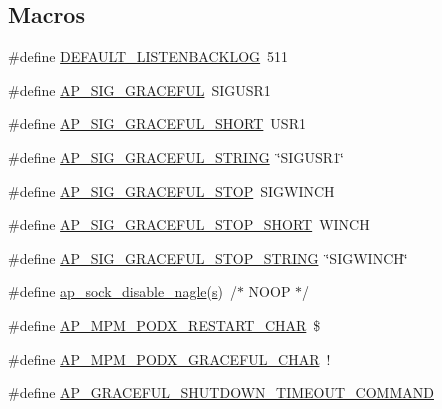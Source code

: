 \subsection*{Macros}
\begin{DoxyCompactItemize}
\item 
\#define \hyperlink{group__APACHE__MPM_gae38c2cf2d0bd84ef4844629a3ca74dd5}{D\+E\+F\+A\+U\+L\+T\+\_\+\+L\+I\+S\+T\+E\+N\+B\+A\+C\+K\+L\+OG}~511
\item 
\#define \hyperlink{group__APACHE__MPM_gab963e1e1fadc57db8d55187b2bef10ef}{A\+P\+\_\+\+S\+I\+G\+\_\+\+G\+R\+A\+C\+E\+F\+UL}~S\+I\+G\+U\+S\+R1
\item 
\#define \hyperlink{group__APACHE__MPM_gae134d70d199502de8ab7baad59b10dbd}{A\+P\+\_\+\+S\+I\+G\+\_\+\+G\+R\+A\+C\+E\+F\+U\+L\+\_\+\+S\+H\+O\+RT}~U\+S\+R1
\item 
\#define \hyperlink{group__APACHE__MPM_ga1222fd19252a88e8c8a1d87247182389}{A\+P\+\_\+\+S\+I\+G\+\_\+\+G\+R\+A\+C\+E\+F\+U\+L\+\_\+\+S\+T\+R\+I\+NG}~\char`\"{}S\+I\+G\+U\+S\+R1\char`\"{}
\item 
\#define \hyperlink{group__APACHE__MPM_ga31540d61cb9d50c63f3450411c5656a8}{A\+P\+\_\+\+S\+I\+G\+\_\+\+G\+R\+A\+C\+E\+F\+U\+L\+\_\+\+S\+T\+OP}~S\+I\+G\+W\+I\+N\+CH
\item 
\#define \hyperlink{group__APACHE__MPM_gaa2ed0ddb81e24ee0345c048d2aebd280}{A\+P\+\_\+\+S\+I\+G\+\_\+\+G\+R\+A\+C\+E\+F\+U\+L\+\_\+\+S\+T\+O\+P\+\_\+\+S\+H\+O\+RT}~W\+I\+N\+CH
\item 
\#define \hyperlink{group__APACHE__MPM_ga478c2f6d96edb8d9d41808f5f807b69d}{A\+P\+\_\+\+S\+I\+G\+\_\+\+G\+R\+A\+C\+E\+F\+U\+L\+\_\+\+S\+T\+O\+P\+\_\+\+S\+T\+R\+I\+NG}~\char`\"{}S\+I\+G\+W\+I\+N\+CH\char`\"{}
\item 
\#define \hyperlink{group__APACHE__MPM_ga8fe82509a8e8f84ae96f811992cdba55}{ap\+\_\+sock\+\_\+disable\+\_\+nagle}(\hyperlink{pcretest_8txt_a062597889ba244b72877454b1d3adecf}{s})~/$\ast$ N\+O\+OP $\ast$/
\item 
\#define \hyperlink{group__APACHE__MPM_ga92ae71c06bd63fb89f61ec7d451201ed}{A\+P\+\_\+\+M\+P\+M\+\_\+\+P\+O\+D\+X\+\_\+\+R\+E\+S\+T\+A\+R\+T\+\_\+\+C\+H\+AR}~\textquotesingle{}\$\textquotesingle{}
\item 
\#define \hyperlink{group__APACHE__MPM_ga0dd9e15b72435f3752fc723d4770c9b0}{A\+P\+\_\+\+M\+P\+M\+\_\+\+P\+O\+D\+X\+\_\+\+G\+R\+A\+C\+E\+F\+U\+L\+\_\+\+C\+H\+AR}~\textquotesingle{}!\textquotesingle{}
\item 
\#define \hyperlink{group__APACHE__MPM_ga348087f11c2fdcd70e789dc9037d43ea}{A\+P\+\_\+\+G\+R\+A\+C\+E\+F\+U\+L\+\_\+\+S\+H\+U\+T\+D\+O\+W\+N\+\_\+\+T\+I\+M\+E\+O\+U\+T\+\_\+\+C\+O\+M\+M\+A\+ND}
\end{DoxyCompactItemize}

